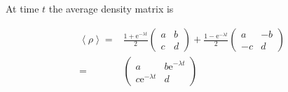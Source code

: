 \documentclass[10pt,fleqn]{article}
\newcommand{\ue}{\mathrm{e}}
\newcommand{\eqar}[1]
{
  \begin{align*}
    #1
  \end{align*}
}
\newcommand{\angl}[1]{{\left\langle{#1}\right\rangle}}
\begin{document}
\subsection{}
At time $t$ the average density matrix is
\eqar{
  \angl{\rho}=&\frac{1+\ue^{-\lambda t}}{2}\begin{pmatrix}
    a&b\\
    c&d
  \end{pmatrix}+\frac{1-\ue^{-\lambda t}}{2}\begin{pmatrix}
    a&-b\\
    -c&d
  \end{pmatrix}\\
  =&\begin{pmatrix}
    a&b\ue^{-\lambda t}\\
    c\ue^{-\lambda t}&d
  \end{pmatrix}
}
\end{document}
